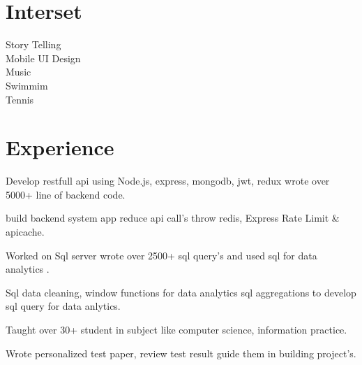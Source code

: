 \documentclass[]{deedy-resume-openfont}
\begin{document}
\begin{minipage}[t]{0.33\textwidth}

\section{Interset}
Story Telling \\
Mobile UI Design \\
Music \\
Swimmim \\
Tennis \\
\sectionsep

%
%

\end{minipage} 
\hfill
\begin{minipage}[t]{0.66\textwidth} 


\section{Experience}

\vspace{\topsep} 
\begin{tightemize}
\item Develop restfull api using Node.js, express, mongodb, jwt, redux wrote over 5000+ line of backend code.
\item build backend system app reduce api call's throw redis, Express Rate Limit & apicache.
\end{tightemize}
\sectionsep

\vspace{\topsep} 
\begin{tightemize}
\item Worked on Sql server wrote over 2500+ sql query's and used sql for data analytics .
\item Sql data cleaning, window functions for data analytics sql aggregations to develop sql query for data anlytics.
\end{tightemize}
\sectionsep

\descript{| }
\begin{tightemize}
\item Taught over 30+ student in subject like computer science, information practice.
\item Wrote personalized test paper, review test result guide them in building project's.
\end{tightemize}
\sectionsep



\end{minipage}
\end{document}
